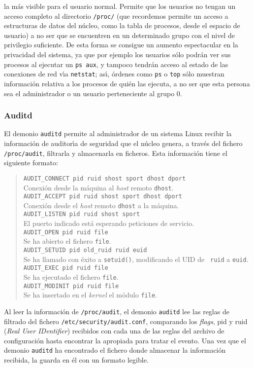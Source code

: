 \begin{itemize}
la m\'as visible para el usuario normal. Permite que los usuarios no tengan un
acceso completo al directorio {\tt /proc/} (que recordemos permite un acceso
a estructuras de datos del n\'ucleo, como la tabla de procesos, desde el 
espacio de usuario) a no ser que se encuentren en un determinado grupo con el
nivel de privilegio suficiente. De esta forma se consigue un aumento 
espectacular en la privacidad del sistema, ya que por ejemplo los usuarios 
s\'olo podr\'an ver sus procesos al ejecutar un {\tt ps aux}, y tampoco 
tendr\'an acceso al estado de las conexiones de red v\'{\i}a {\tt netstat}; 
as\'{\i}, \'ordenes como {\tt ps} o {\tt top} s\'olo muestran informaci\'on 
relativa a los procesos de qui\'en las ejecuta, a no ser que esta persona sea 
el administrador o un usuario perteneciente al grupo 0.
\end{itemize}
\subsubsection{Auditd}
El demonio {\tt auditd} permite al administrador de un sistema Linux recibir
la informaci\'on de auditor\'{\i}a de seguridad que el n\'ucleo genera, a 
trav\'es del fichero {\tt /proc/audit}, filtrarla y almacenarla en ficheros.
Esta informaci\'on tiene el siguiente formato:
\begin{quote}
{\tt AUDIT\_CONNECT pid ruid shost sport dhost dport}\\
Conexi\'on desde la m\'aquina al {\it host} remoto {\tt dhost}.\\
{\tt AUDIT\_ACCEPT pid ruid shost sport dhost dport}\\
Conexi\'on desde el {\it host} remoto {\tt dhost} a la m\'aquina.\\
{\tt AUDIT\_LISTEN pid ruid shost sport}\\
El puerto indicado est\'a esperando peticiones de servicio.\\
{\tt AUDIT\_OPEN pid ruid file}\\
Se ha abierto el fichero {\tt file}.\\
{\tt AUDIT\_SETUID pid old\_ruid ruid euid}\\
Se ha llamado con \'exito a {\tt setuid()}, modificando el {\sc UID} de {\tt 
ruid} a {\tt euid}.\\
{\tt AUDIT\_EXEC pid ruid file}\\
Se ha ejecutado el fichero {\tt file}.\\
{\tt AUDIT\_MODINIT pid ruid file}\\
Se ha insertado en el {\it kernel} el m\'odulo {\tt file}.
\end{quote}
Al leer la informaci\'on de {\tt /proc/audit}, el demonio {\tt auditd} lee las
reglas de filtrado del fichero {\tt /etc/security/audit.conf}, comparando los
{\it flags}, {\sc pid} y {\sc ruid} ({\it Real User IDentifier}) recibidos con
cada una de las reglas del archivo de configuraci\'on hasta encontrar la
apropiada para tratar el evento. Una vez que el demonio {\tt auditd} ha 
encontrado el fichero donde almacenar la informaci\'on recibida, la guarda
en \'el con un formato legible.
